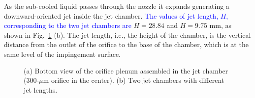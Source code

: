 \documentclass[review,preprint,12pt]{elsarticle}
\begin{document}
As the sub-cooled liquid passes through the nozzle it expands generating a downward-oriented jet inside the jet chamber. \textcolor{blue}{The values of jet length, $H$, corresponding to the two jet chambers are} $H = 28.84$  and $H = 9.75$ mm, as shown in Fig.~\ref{fig:Figure_4} (b). The jet length, i.e., the height of the chamber, is the vertical distance from the outlet of the orifice to the base of the chamber, which is at the same level of the impingement surface.

\begin{figure}[!h]
\centering
{}
\hfil
{}
\caption{(a) Bottom view of the orifice plenum assembled in the jet chamber (300-$\mu$m orifice in the center). (b) Two jet chambers with different jet lengths.}
\label{fig:Figure_4}
\end{figure} 
\end{document}
